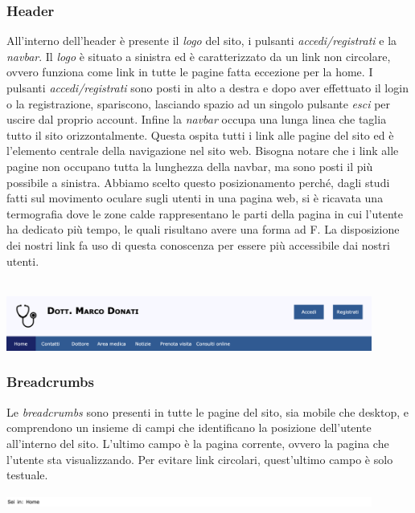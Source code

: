 \subsubsection{Header}
All’interno dell’header è presente il \textit{logo} del sito, i pulsanti \textit{accedi/registrati} e la \textit{navbar}.
Il \textit{logo} è situato a sinistra ed è caratterizzato da un link non circolare, ovvero funziona come link in tutte le pagine fatta eccezione per la home.
I pulsanti \textit{accedi/registrati} sono posti in alto a destra e dopo aver effettuato il login o la registrazione, spariscono, lasciando spazio ad un singolo pulsante \textit{esci} per uscire dal proprio account.
Infine la \textit{navbar} occupa una lunga linea che taglia tutto il sito orizzontalmente.
Questa ospita tutti i link alle pagine del sito ed è l’elemento centrale della navigazione nel sito web.
Bisogna notare che i link alle pagine non occupano tutta la lunghezza della navbar, ma sono posti il più possibile a sinistra.
Abbiamo scelto questo posizionamento perché, dagli studi fatti sul movimento oculare sugli utenti in una pagina web, si è ricavata una termograﬁa dove le zone calde rappresentano le parti della pagina in cui l’utente ha dedicato più tempo, le quali risultano avere una forma ad F.
La disposizione dei nostri link fa uso di questa conoscenza per essere più accessibile dai nostri utenti. \\ \\

\begin{center}
\includegraphics[width=12cm]{../img/header}
\end{center}


\subsubsection{Breadcrumbs}
Le \textit{breadcrumbs} sono presenti in tutte le pagine del sito, sia mobile che desktop, e comprendono un insieme di campi che identiﬁcano la posizione dell’utente all’interno del sito. L’ultimo campo è la pagina corrente, ovvero la pagina che l’utente sta visualizzando. Per evitare link circolari, quest’ultimo campo è solo testuale.

\begin{center}
\includegraphics[width=12cm]{../img/bread1}
\end{center}

